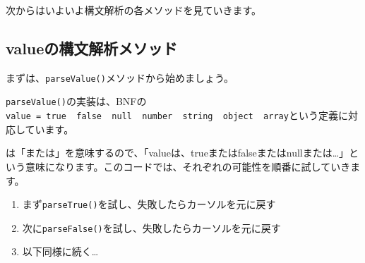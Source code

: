 次からはいよいよ構文解析の各メソッドを見ていきます。

\hypertarget{chapter3-valueux306eux69cbux6587ux89e3ux6790ux30e1ux30bdux30c3ux30c9}{%
\subsection{valueの構文解析メソッド}\label{chapter3-valueux306eux69cbux6587ux89e3ux6790ux30e1ux30bdux30c3ux30c9}}

まずは、\texttt{parseValue()}メソッドから始めましょう。

\begin{Shaded}
\begin{Highlighting}[]
     \NormalTok{() \{}
        \NormalTok{ \{}
             \NormalTok{();}
\NormalTok{        \} }\NormalTok{ (}
\NormalTok{        \}}

        \NormalTok{ \{}
             \NormalTok{();}
\NormalTok{        \} }\NormalTok{ (}
\NormalTok{        \}}
\NormalTok{    \}}
\end{Highlighting}
\end{Shaded}

\texttt{parseValue()}の実装は、BNFの\texttt{value\ =\ true\ \textbar{}\ false\ \textbar{}\ null\ \textbar{}\ number\ \textbar{}\ string\ \textbar{}\ object\ \textbar{}\ array}という定義に対応しています。

\texttt{\textbar{}}は「または」を意味するので、「valueは、trueまたはfalseまたはnullまたは\ldots」という意味になります。このコードでは、それぞれの可能性を順番に試していきます。

\begin{enumerate}
\def\labelenumi{\arabic{enumi}.}
\tightlist
\item
  まず\texttt{parseTrue()}を試し、失敗したらカーソルを元に戻す
\item
  次に\texttt{parseFalse()}を試し、失敗したらカーソルを元に戻す
\item
  以下同様に続く\ldots{}
\end{enumerate}

